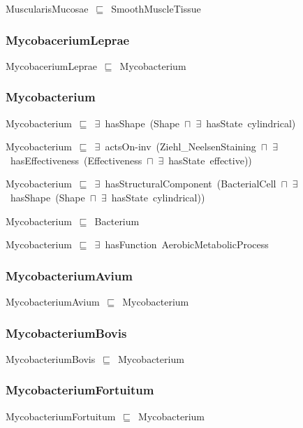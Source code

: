 \documentclass{article}
\begin{document}
MuscularisMucosae~\ensuremath{\sqsubseteq}~SmoothMuscleTissue~

\subsubsection*{MycobaceriumLeprae}

MycobaceriumLeprae~\ensuremath{\sqsubseteq}~Mycobacterium~

\subsubsection*{Mycobacterium}

Mycobacterium~\ensuremath{\sqsubseteq}~\ensuremath{\exists}~hasShape~(Shape~\ensuremath{\sqcap}~\ensuremath{\exists}~hasState~cylindrical)~

Mycobacterium~\ensuremath{\sqsubseteq}~\ensuremath{\exists}~actsOn-inv~(Ziehl\_NeelsenStaining~\ensuremath{\sqcap}~\ensuremath{\exists}~hasEffectiveness~(Effectiveness~\ensuremath{\sqcap}~\ensuremath{\exists}~hasState~effective))~

Mycobacterium~\ensuremath{\sqsubseteq}~\ensuremath{\exists}~hasStructuralComponent~(BacterialCell~\ensuremath{\sqcap}~\ensuremath{\exists}~hasShape~(Shape~\ensuremath{\sqcap}~\ensuremath{\exists}~hasState~cylindrical))~

Mycobacterium~\ensuremath{\sqsubseteq}~Bacterium~

Mycobacterium~\ensuremath{\sqsubseteq}~\ensuremath{\exists}~hasFunction~AerobicMetabolicProcess~

\subsubsection*{MycobacteriumAvium}

MycobacteriumAvium~\ensuremath{\sqsubseteq}~Mycobacterium~

\subsubsection*{MycobacteriumBovis}

MycobacteriumBovis~\ensuremath{\sqsubseteq}~Mycobacterium~

\subsubsection*{MycobacteriumFortuitum}

MycobacteriumFortuitum~\ensuremath{\sqsubseteq}~Mycobacterium~
\end{document}
